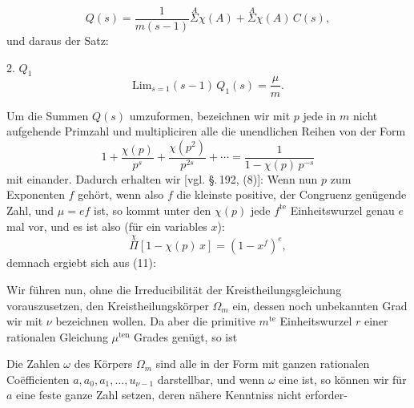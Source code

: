 \[
Q(s) = \frac{1}{m(s-1)} \overset{A}{\Sigma} \chi(A) + \overset{A}{\Sigma} \chi(A)\, C(s),
\]
und daraus der Satz:

2.  $Q_1$ 
\[
\mathrm{Lim}_{s=1} (s-1)\, Q_1(s) = \frac{\mu}{m}.
\]

Um die Summen $Q(s)$ umzuformen, bezeichnen wir mit $p$ jede in $m$ nicht
aufgehende Primzahl und multipliciren alle die unendlichen Reihen von der
Form
\[
1 + \frac{\chi(p)}{p^s} + \frac{\chi(p^2)}{p^{2s}} + \cdots
= \frac{1}{1 - \chi(p)\, p^{-s}}
\]
mit einander. Dadurch erhalten wir [vgl. \S.\,192, (8)]:
Wenn nun $p$ zum Exponenten $f$ gehört, wenn also $f$ die kleinste positive,
der Congruenz
genügende Zahl, und $\mu = ef$ ist, so kommt unter den $\chi(p)$ jede
$f^{\text{te}}$ Einheitswurzel genau $e$ mal vor, und es ist also (für ein
variables $x$):
\[
\overset{\chi}{\Pi} [1 - \chi(p)\, x] = (1 - x^f)^e,
\]
demnach ergiebt sich aus (11):

Wir führen nun, ohne die Irreducibilität der Kreistheilungsgleichung
vorauszusetzen, den Kreistheilungskörper $\Omega_m$ ein, dessen noch
unbekannten Grad wir mit $\nu$ bezeichnen wollen. Da aber die primitive
$m^{\text{te}}$ Einheitswurzel $r$ einer rationalen Gleichung
$\mu^{\text{ten}}$ Grades genügt, so ist

Die Zahlen $\omega$ des Körpers $\Omega_m$ sind alle in der Form
mit ganzen rationalen Coëfficienten $a, a_0, a_1, \ldots, u_{\nu-1}$ %
darstellbar, und wenn $\omega$ eine  ist, so können wir
für $a$ eine feste ganze Zahl setzen, deren nähere Kenntniss nicht erforder-
